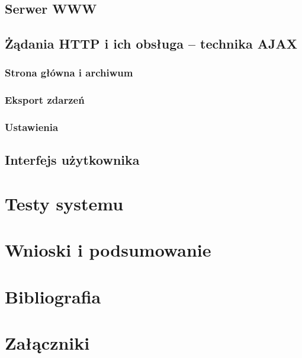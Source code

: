 \documentclass[a4paper,12pt,twoside]{article}
\begin{document}
\subsection{Serwer WWW}

\subsection{Żądania HTTP i ich obsługa -- technika AJAX}

\subsubsection{Strona główna i archiwum}

\subsubsection{Eksport zdarzeń}

\subsubsection{Ustawienia}

\subsection{Interfejs użytkownika}

\section{Testy systemu}

\section{Wnioski i podsumowanie}

\section{Bibliografia}

\section{Załączniki}
\end{document}
